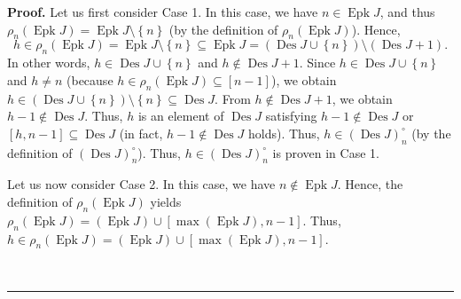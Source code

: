 \documentclass[numbers=enddot,12pt,final,onecolumn,notitlepage]{scrartcl}%
\theoremstyle{definition}
\newenvironment{proof}[1][Proof]{\noindent\textbf{#1.} }{\ \rule{0.5em}{0.5em}}
\newenvironment{verlong}{}{}
\begin{document}
\begin{verlong}
\begin{proof}
Let us first consider Case 1. In this case, we have $n\in\operatorname*{Epk}%
J$, and thus $\rho_{n}\left(  \operatorname*{Epk}J\right)
=\operatorname*{Epk}J\setminus\left\{  n\right\}  $ (by the definition of
$\rho_{n}\left(  \operatorname*{Epk}J\right)  $). Hence,
\[
h\in\rho_{n}\left(  \operatorname*{Epk}J\right)  =\operatorname*{Epk}%
J\setminus\left\{  n\right\}  \subseteq\operatorname*{Epk}J=\left(
\operatorname*{Des}J\cup\left\{  n\right\}  \right)  \setminus\left(
\operatorname*{Des}J+1\right)  .
\]
In other words, $h\in\operatorname*{Des}J\cup\left\{  n\right\}  $ and
$h\notin\operatorname*{Des}J+1$. Since $h\in\operatorname*{Des}J\cup\left\{
n\right\}  $ and $h\neq n$ (because $h\in\rho_{n}\left(  \operatorname*{Epk}%
J\right)  \subseteq\left[  n-1\right]  $), we obtain $h\in\left(
\operatorname*{Des}J\cup\left\{  n\right\}  \right)  \setminus\left\{
n\right\}  \subseteq\operatorname*{Des}J$. From $h\notin\operatorname*{Des}%
J+1$, we obtain $h-1\notin\operatorname*{Des}J$. Thus, $h$ is an element of
$\operatorname*{Des}J$ satisfying $h-1\notin\operatorname*{Des}J$ or $\left[
h,n-1\right]  \subseteq\operatorname*{Des}J$ (in fact, $h-1\notin%
\operatorname*{Des}J$ holds). Thus, $h\in\left(  \operatorname*{Des}J\right)
_{n}^{\circ}$ (by the definition of $\left(  \operatorname*{Des}J\right)
_{n}^{\circ}$). Thus, $h\in\left(  \operatorname*{Des}J\right)  _{n}^{\circ}$
is proven in Case 1.

Let us now consider Case 2. In this case, we have $n\notin\operatorname*{Epk}%
J$. Hence, the definition of $\rho_{n}\left(  \operatorname*{Epk}J\right)  $
yields $\rho_{n}\left(  \operatorname*{Epk}J\right)  =\left(
\operatorname*{Epk}J\right)  \cup\left[  \max\left(  \operatorname*{Epk}%
J\right)  ,n-1\right]  $. Thus, $h\in\rho_{n}\left(  \operatorname*{Epk}%
J\right)  =\left(  \operatorname*{Epk}J\right)  \cup\left[  \max\left(
\operatorname*{Epk}J\right)  ,n-1\right]  $.


\end{proof}
\end{verlong}
\end{document}
